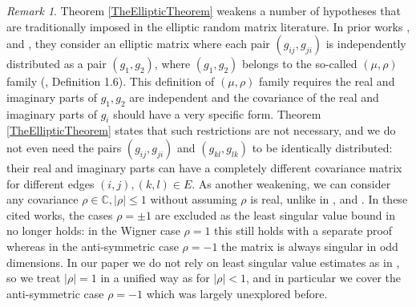 \documentclass[11pt,reqno]{amsart}
\theoremstyle{plain}
\theoremstyle{remark}
\newtheorem{remark}[theorem]{Remark}
\numberwithin{equation}{section}
\begin{document}
\begin{remark} Theorem \ref{TheEllipticTheorem} weakens a number of hypotheses that are traditionally imposed in the elliptic random matrix literature.
    In prior works \cite{article1221}, \cite{nguyen2015elliptic} and \cite{alt2022local}, they consider an elliptic matrix where each pair $(g_{ij},g_{ji})$ is independently distributed as a pair $(g_1,g_2)$, where $(g_1,g_2)$ belongs to the so-called $(\mu,\rho)$ family (\cite{nguyen2015elliptic}, Definition 1.6). This definition of $(\mu,\rho)$ family requires the real and imaginary parts of $g_1,g_2$ are independent and the covariance of the real and imaginary parts of $g_i$ should have a very specific form. Theorem \ref{TheEllipticTheorem} states that such restrictions are not necessary, and we do not even need the pairs $(g_{ij},g_{ji})$ and $(g_{kl},g_{lk})$ to be identically distributed: their real and imaginary parts can have a completely different covariance matrix for different edges $(i,j),(k,l)\in E$. As another weakening, we can consider any covariance $\rho\in\mathbb{C},|\rho|\leq 1$ without assuming $\rho$ is real, unlike in \cite{article1221}, \cite{nguyen2015elliptic} and \cite{alt2022local}. In these cited works, the cases $\rho=\pm 1$ are excluded as the least singular value bound in \cite{nguyen2015elliptic} no longer holds: in the Wigner case $\rho=1$ this still holds with a separate proof \cite{nguyen2012least} whereas in the anti-symmetric case $\rho=-1$ the matrix is always singular in odd dimensions. In our paper we do not rely on least singular value estimates as in \cite{nguyen2015elliptic}, so we treat $|\rho|=1$ in a unified way as for $|\rho|<1$, and in particular we cover the anti-symmetric case $\rho=-1$ which was largely unexplored before.

    \end{remark}
\end{document}
